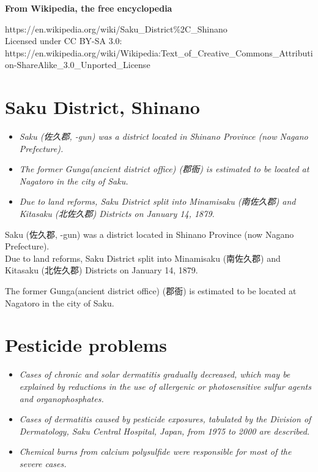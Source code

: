 \textbf{From Wikipedia, the free encyclopedia}

https://en.wikipedia.org/wiki/Saku\_District\%2C\_Shinano\\
Licensed under CC BY-SA 3.0:\\
https://en.wikipedia.org/wiki/Wikipedia:Text\_of\_Creative\_Commons\_Attribution-ShareAlike\_3.0\_Unported\_License

\section{Saku District, Shinano}\label{saku-district-shinano}

\begin{itemize}
\item
  \emph{Saku (佐久郡, -gun) was a district located in Shinano Province
  (now Nagano Prefecture).}
\item
  \emph{The former Gunga(ancient district office) (郡衙) is estimated to
  be located at Nagatoro in the city of Saku.}
\item
  \emph{Due to land reforms, Saku District split into Minamisaku
  (南佐久郡) and Kitasaku (北佐久郡) Districts on January 14, 1879.}
\end{itemize}

Saku (佐久郡, -gun) was a district located in Shinano Province (now
Nagano Prefecture).\\
Due to land reforms, Saku District split into Minamisaku (南佐久郡) and
Kitasaku (北佐久郡) Districts on January 14, 1879.

The former Gunga(ancient district office) (郡衙) is estimated to be
located at Nagatoro in the city of Saku.

\section{Pesticide problems}\label{pesticide-problems}

\begin{itemize}
\item
  \emph{Cases of chronic and solar dermatitis gradually decreased, which
  may be explained by reductions in the use of allergenic or
  photosensitive sulfur agents and organophosphates.}
\item
  \emph{Cases of dermatitis caused by pesticide exposures, tabulated by
  the Division of Dermatology, Saku Central Hospital, Japan, from 1975
  to 2000 are described.}
\item
  \emph{Chemical burns from calcium polysulfide were responsible for
  most of the severe cases.}
\end{itemize}

